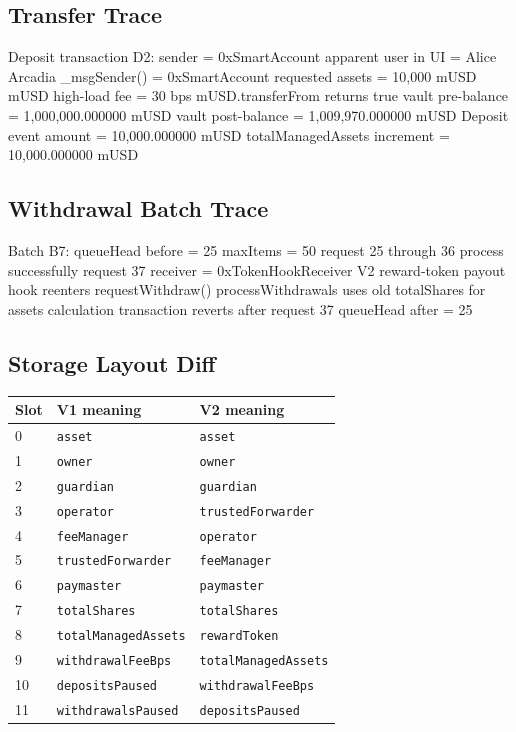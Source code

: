 \subsection*{Transfer Trace}

\begin{codeblock}
Deposit transaction D2:
    sender = 0xSmartAccount
    apparent user in UI = Alice
    Arcadia _msgSender() = 0xSmartAccount
    requested assets = 10,000 mUSD
    mUSD high-load fee = 30 bps
    mUSD.transferFrom returns true
    vault pre-balance = 1,000,000.000000 mUSD
    vault post-balance = 1,009,970.000000 mUSD
    Deposit event amount = 10,000.000000 mUSD
    totalManagedAssets increment = 10,000.000000 mUSD
\end{codeblock}

\subsection*{Withdrawal Batch Trace}

\begin{codeblock}
Batch B7:
    queueHead before = 25
    maxItems = 50
    request 25 through 36 process successfully
    request 37 receiver = 0xTokenHookReceiver
    V2 reward-token payout hook reenters requestWithdraw()
    processWithdrawals uses old totalShares for assets calculation
    transaction reverts after request 37
    queueHead after = 25
\end{codeblock}

\subsection*{Storage Layout Diff}

\begin{center}
\begin{tabular}{@{}lll@{}}
\toprule
Slot & V1 meaning & V2 meaning \\
\midrule
0 & \texttt{asset} & \texttt{asset} \\
1 & \texttt{owner} & \texttt{owner} \\
2 & \texttt{guardian} & \texttt{guardian} \\
3 & \texttt{operator} & \texttt{trustedForwarder} \\
4 & \texttt{feeManager} & \texttt{operator} \\
5 & \texttt{trustedForwarder} & \texttt{feeManager} \\
6 & \texttt{paymaster} & \texttt{paymaster} \\
7 & \texttt{totalShares} & \texttt{totalShares} \\
8 & \texttt{totalManagedAssets} & \texttt{rewardToken} \\
9 & \texttt{withdrawalFeeBps} & \texttt{totalManagedAssets} \\
10 & \texttt{depositsPaused} & \texttt{withdrawalFeeBps} \\
11 & \texttt{withdrawalsPaused} & \texttt{depositsPaused} \\
\bottomrule
\end{tabular}
\end{center}

